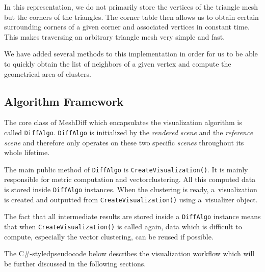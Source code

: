 In this representation, we do not primarily store the vertices of the triangle mesh but the corners of the triangles. The corner table then allows us to obtain certain surrounding corners of a given corner and associated vertices in constant time. This makes traversing an arbitrary triangle mesh very simple and fast.

We have added several methods to this implementation in order for us to be able to quickly obtain the list of neighbors of a given vertex and compute the geometrical area of clusters.

\subsection{Algorithm Framework}
\label{subsec:implementation-algorithm-framework}

The core class of MeshDiff which encapsulates the visualization algorithm is called \verb+DiffAlgo+. \verb+DiffAlgo+ is initialized by the {\it rendered scene} and the {\it reference scene} and therefore only operates on these two specific {\it scenes} throughout its whole lifetime.

The main public method of \verb+DiffAlgo+ is \verb+CreateVisualization()+. It is mainly responsible for metric computation and vector\footnotemark clustering. All this computed data is stored inside \verb+DiffAlgo+ instances. When the clustering is ready, a~visualization is created and outputted from \verb+CreateVisualization()+ using a~visualizer object.


The fact that all intermediate results are stored inside a \verb+DiffAlgo+ instance means that when \verb+CreateVisualization()+ is called again, data which is difficult to compute, especially the vector clustering, can be reused if possible.

The C\#-styled\footnotemark pseudocode below describes the visualization workflow which will be further discussed in the following sections.


